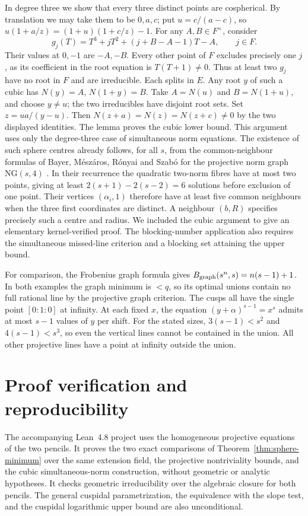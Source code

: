 \documentclass[preprint,12pt,numbers]{elsarticle}
\begin{document}
In degree three we show that every three distinct points are
cospherical. By translation we may take them to be $0,a,c$; put
$u=c/(a-c)$, so $u(1+a/z)=(1+u)(1+c/z)-1$. For any $A,B\in
F^\times$, consider
\[
             g_j(T)=T^3+jT^2+(j+B-A-1)T-A,\qquad j\in F .
\]
Their values at $0,-1$ are $-A,-B$. Every other point of $F$ excludes
precisely one $j$, as its coefficient in the root equation is
$T(T+1)\ne0$. Thus at least two $g_j$ have no root in $F$ and are
irreducible. Each splits in $E$. Any root $y$ of such a cubic has
$N(y)=A$, $N(1+y)=B$. Take $A=N(u)$ and $B=N(1+u)$, and choose $y\ne
u$; the two irreducibles have disjoint root sets. Set $z=ua/(y-u)$.
Then $N(z+a)=N(z)=N(z+c)\ne0$ by the two displayed identities.
The lemma proves the cubic lower bound. This argument uses only the
degree-three case of simultaneous norm equations.
The existence of such sphere centres already follows, for all $s$, from
the common-neighbour formulas of Bayer, M\'esz\'aros, R\'onyai and
Szab\'o for the projective norm graph $\mathrm{NG}(s,4)$
\cite[Thm.~1(a), Lem.~2(iv), Prop.~1]{Bayer}. In their recurrence
the quadratic two-norm fibres have at most two points, giving at least
$2(s+1)-2(s-2)=6$ solutions before exclusion of one point. Their
vertices $(\alpha_i,1)$ therefore have at least five common neighbours
when the three first coordinates are distinct. A neighbour $(b,R)$
specifies precisely such a centre and radius. We included the cubic
argument to give an elementary kernel-verified proof. The
blocking-number application also requires the simultaneous missed-line
criterion and a blocking set attaining the upper bound.

For comparison, the Frobenius graph formula gives
$B_{\rm graph}(s^n,s)=n(s-1)+1$. In both examples the graph minimum
is $<q$, so its optimal unions contain no full rational line by the
projective graph criterion. The cusps all have the single point
$[0:1:0]$ at infinity. At each fixed $x$, the equation
$(y+\alpha)^{s-1}=x^s$ admits at most $s-1$ values of $y$ per shift.
For the stated sizes, $3(s-1)<s^2$ and $4(s-1)<s^3$, so even the
vertical lines cannot be contained in the union. All other projective
lines have a point at infinity outside the union.

\section*{Proof verification and reproducibility}
The accompanying Lean~4.8 project uses the homogeneous projective
equations of the two pencils. It proves the two exact comparisons of
Theorem~\ref{thm:sphere-minimum} over the same extension field, the
projective nontriviality bounds, and the cubic simultaneous-norm
construction, without geometric or analytic hypotheses. It checks
geometric irreducibility over the algebraic closure for both pencils. The
general cuspidal parametrization, the equivalence with the slope test,
and the cuspidal logarithmic upper bound are also unconditional.
\end{document}
